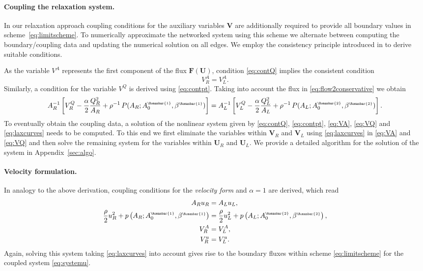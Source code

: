 \documentclass[a4paper,11pt]{article}
\newcommand{\rmn}[1]{\text{\tiny \Romanbar{#1}}}
\begin{document}
	
\paragraph{Coupling the relaxation system.}
In our relaxation approach coupling conditions for the auxiliary variables $\mathbf{V}$ are additionally required to provide all boundary values in scheme~\eqref{eq:limitscheme}. To numerically approximate the networked system using this scheme we alternate between computing the boundary/coupling data and updating the numerical solution on all edges. We employ the consistency principle introduced in \cite{herty2023centrschemtwo} to derive suitable conditions.

As the variable $V^A$ represents the first component of the flux $\mathbf F(\mathbf U)$, condition \eqref{eq:contQ} implies the consistent condition
	\begin{equation}\label{eq:VA}
          V_R^A = V_L^A.
	\end{equation}
Similarly, a condition for the variable $V^Q$ is derived using \eqref{eq:contpt}. Taking into account the flux in \eqref{eq:flow2conservative} we obtain
  \begin{equation}\label{eq:VQ}
A_R^{-1}\left[ V^Q_R - \frac{\alpha}{2} \frac{Q_R^2}{A_R} +   \rho^{-1} \, P(A_R; A_0^{\rmn{1}}, \beta^{\rmn{1}}) \right]= A_L^{-1}\left[ V^Q_L - \frac{\alpha}{2} \frac{Q_L^2}{A_L} + \rho^{-1}\,P(A_L; A_0^{\rmn{2}}, \beta^{\rmn{2}}) \right].
  \end{equation}
To eventually obtain the coupling data, a solution of the nonlinear system given by \eqref{eq:contQ}, \eqref{eq:contpt}, \eqref{eq:VA}, \eqref{eq:VQ} and \eqref{eq:laxcurves} needs to be computed. To this end we first eliminate the variables within $\mathbf V_R$ and $\mathbf V_L$ using \eqref{eq:laxcurves} in \eqref{eq:VA} and \eqref{eq:VQ} and then solve the remaining system for the variables within $\mathbf U_R$ and $\mathbf U_L$. We provide a detailed algorithm for the solution of the system in Appendix~\ref{sec:algo}.

\paragraph{Velocity formulation.}
In analogy to the above derivation, coupling conditions for the \textit{velocity form} and $\alpha=1$ are derived, which read
    \begin{align*}
        A_R u_R &= A_L u_L,\\
      \frac{\rho}{2} u_R^2 + p\left( A_R; A_0^{\rmn{1}}, \beta^{\rmn{1}} \right) &= \frac{\rho}{2} u_L^2 + p\left( A_L; A_0^{\rmn{2}}, \beta^{\rmn{2}} \right),\\
      V_R^A &= V_L^A,\\
      V_R^u &= V_L^u.
    \end{align*}
Again, solving this system taking \eqref{eq:laxcurves} into account gives rise to the boundary fluxes within scheme \eqref{eq:limitscheme} for the coupled system \eqref{eq:systemu}. 
	
\end{document}

